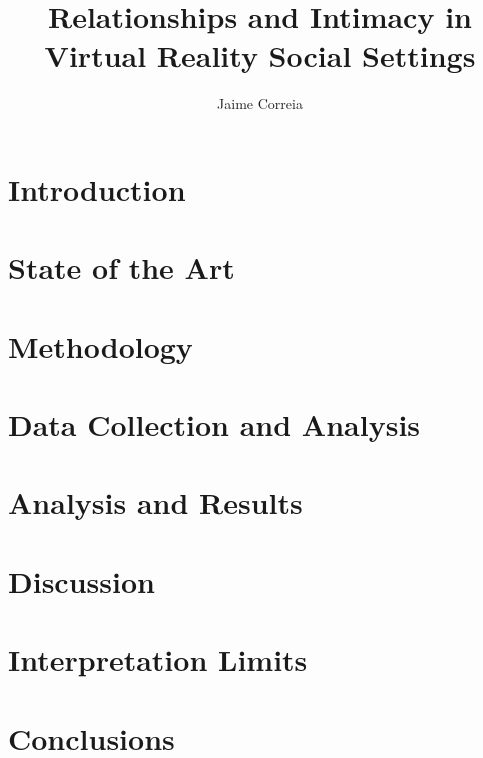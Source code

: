 \documentclass[acmlarge]{acmart}
\begin{document}
\title{Relationships and Intimacy in Virtual Reality Social Settings}

\author{Jaime Correia}
\renewcommand{\shortauthors}{Correia}

\begin{abstract}
  \label{section::abstract}
\end{abstract}

\maketitle
\section{Introduction}\label{sec::introduction}
\section{State of the Art}\label{sec::soa}
\section{Methodology}\label{sec::methodology}
\section{Data Collection and Analysis}\label{sec::datacollection}
\section{Analysis and Results}\label{sec::analysisandresults}
\section{Discussion}\label{sec::discussion}
\section{Interpretation Limits}\label{sec::interpretationlimits}
\section{Conclusions}\label{sec::conclusions}





\end{document}
